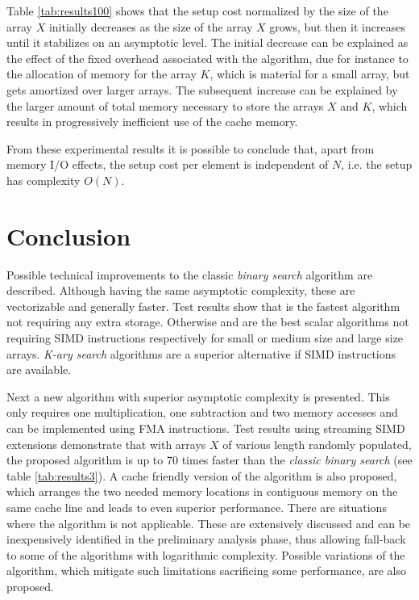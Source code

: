 \documentclass[preprint,1p,times]{elsarticle}
\begin{document}
Table \ref{tab:results100} shows that the setup cost normalized by the size of the array $X$ initially decreases as the size of the array $X$ grows, but then it increases until it stabilizes on an asymptotic level.
The initial decrease can be explained as the effect of the fixed overhead associated with the algorithm, due for instance to the allocation of memory for the array $K$, which is material for a small array, but gets amortized over larger arrays. 
The subsequent increase can be explained by the larger amount of total memory necessary to store the arrays $X$ and $K$, which results in progressively inefficient use of the cache memory.

From these experimental results it is possible to conclude that, apart from memory I/O effects, the setup cost per element is independent of $N$, i.e. the setup has complexity $O(N)$.




\section{Conclusion}
Possible technical improvements to the classic \textit{binary search} algorithm are described. Although having the same asymptotic complexity, these are vectorizable and generally faster. Test results show that \textit{\ClassicOffsetName} is the fastest algorithm not requiring any extra storage. Otherwise \textit{\BitSetName} and \textit{\EytzingerName} are the best scalar algorithms not requiring SIMD instructions respectively for small or medium size and large size arrays. \textit{K-ary search} algorithms are a superior alternative if SIMD instructions are available.

Next a new algorithm with superior asymptotic complexity is presented. This only requires one multiplication, one subtraction and two memory accesses and can be implemented using FMA instructions. Test results using streaming SIMD extensions demonstrate that with arrays $X$ of various length randomly populated, the proposed algorithm is up to 70 times faster than the \textit{classic binary search} (see table \ref{tab:results3}). A cache friendly version of the algorithm is also proposed, which arranges the two needed memory locations in contiguous memory on the same cache line and leads to even superior performance. There are situations where the algorithm is not applicable. These are extensively discussed and can be inexpensively identified in the preliminary analysis phase, thus allowing fall-back to some of the algorithms with logarithmic complexity. Possible variations of the algorithm, which mitigate such limitations sacrificing some performance, are also proposed.
\end{document}
